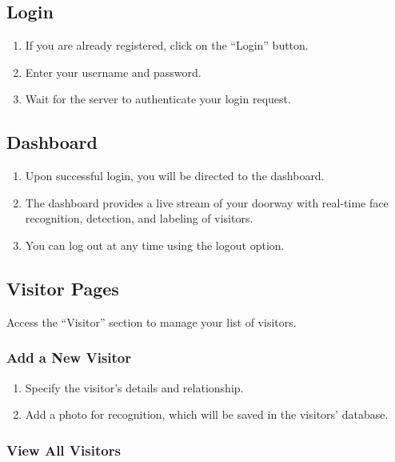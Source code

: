 \documentclass[a4 paper, 12pt]{article}
\begin{document}
\subsection{Login}

\begin{enumerate}
  \item If you are already registered, click on the ``Login'' button.
  \item Enter your username and password.
  \item Wait for the server to authenticate your login request.
\end{enumerate}

\subsection{Dashboard}

\begin{enumerate}
  \item Upon successful login, you will be directed to the dashboard.
  \item The dashboard provides a live stream of your doorway with real-time face recognition, detection, and labeling of visitors.
  \item You can log out at any time using the logout option.
\end{enumerate}

\subsection{Visitor Pages}

Access the ``Visitor'' section to manage your list of visitors.

\subsubsection{Add a New Visitor}

\begin{enumerate}
  \item Specify the visitor's details and relationship.
  \item Add a photo for recognition, which will be saved in the visitors' database.
\end{enumerate}

\subsubsection{View All Visitors}
\end{document}
